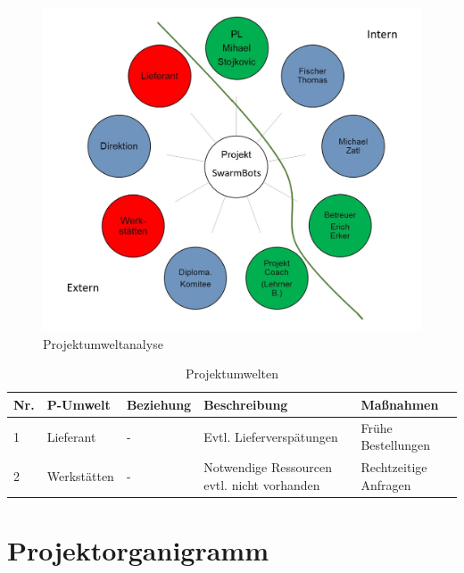 \begin{figure}[htbp]
    \centering
    \includegraphics[width=\textwidth]{img/Projektumweltanalyse.jpeg} 
    \caption{Projektumweltanalyse}
\end{figure}

\begin{table}[H]
    \centering
    \begin{tabular}{|l|l|l|p{4.5cm}|l|}
        \hline
        \textbf{Nr.} & \textbf{P-Umwelt} & \textbf{Beziehung} & \textbf{Beschreibung} & \textbf{Maßnahmen} \\
        \hline
        1 & Lieferant & - & Evtl. Lieferverspätungen & Frühe Bestellungen \\
        \hline
        2 & Werkstätten & - & Notwendige Ressourcen evtl. nicht vorhanden & Rechtzeitige Anfragen \\
        \hline
    \end{tabular}
    \caption{Projektumwelten}
    \label{tab:projektumwelten}
\end{table}

\newpage

\section{Projektorganigramm}


